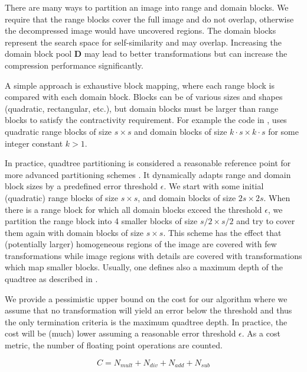 There are many ways to partition an image into range and domain blocks. We require that the range blocks cover the full image and do not overlap, otherwise the
decompressed image would have uncovered regions. The domain blocks represent the search space for self-similarity and may overlap.
Increasing the domain block pool $\boldsymbol{D}$ may lead to better transformations but can increase the compression performance significantly.

A simple approach is exhaustive block mapping, where each range block is compared with each domain block. Blocks can be of various sizes and shapes 
(quadratic, rectangular, etc.), but domain blocks must be larger than range blocks to satisfy the contractivity requirement. For example the code in \cite{github-python}, 
uses quadratic range blocks of size $s \times s$ and domain blocks of size $k\cdot s \times k \cdot s$ for some integer constant $k > 1$.

In practice, quadtree partitioning is considered a reasonable reference point for more advanced partitioning schemes \cite{fisher2012}.
It dynamically adapts range and domain block sizes by a predefined error threshold $\epsilon$.
We start with some initial (quadratic) range blocks of size $s \times s$, and domain blocks of size $2s \times 2s$.
When there is a range block for which all domain blocks exceed the threshold $\epsilon$, we partition
the range block into 4 smaller blocks of size $s/2 \times s/2$ and try to cover them again with domain blocks of size $s \times s$.
This scheme has the effect that (potentially larger) homogeneous regions of the image are covered with few transformations while image
regions with details are covered with transformations which map smaller blocks.
Usually, one defines also a maximum depth of the quadtree as described in \cite{fisher2012}.


We provide a pessimistic upper bound on the cost for our
algorithm where we assume that no transformation will yield an error below
the threshold and thus the only termination criteria is the maximum quadtree
depth. In practice, the cost will be (much) lower assuming a reasonable error
threshold $\epsilon$. As a cost metric, the number of floating point operations
are counted.

\begin{equation} \label{eq:cost}
C = N_{mult} + N_{div} + N_{add} + N_{sub}
\end{equation}

